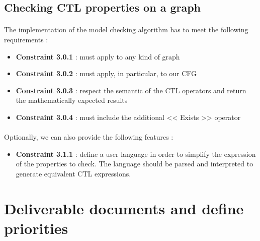 \documentclass{report}
\begin{document}
\subsection{Checking CTL properties on a graph}

\paragraph{}
\hspace{4mm}The implementation of the model checking algorithm has to meet the following requirements :

\vspace{1.5mm}
\begin{itemize}
\item \textbf{Constraint 3.0.1} : must apply to any kind of graph\vspace{1mm}
\item \textbf{Constraint 3.0.2} : must apply, in particular, to our CFG\vspace{1mm}
\item \textbf{Constraint 3.0.3} : respect the semantic of the CTL operators and return the mathematically expected results\vspace{1mm}
\item \textbf{Constraint 3.0.4} : must include the additional << Exists >> operator\vspace{1mm}
\end{itemize}

\paragraph{}
\hspace{4mm}Optionally, we can also provide the following features  :

\vspace{1.5mm}
\begin{itemize}
\item \textbf{Constraint 3.1.1} : define a user language in order to simplify the expression of the properties to check. The language should be parsed and interpreted to generate equivalent CTL expressions.\vspace{1mm}
\end{itemize}

\section{Deliverable documents and define priorities}
\end{document}
